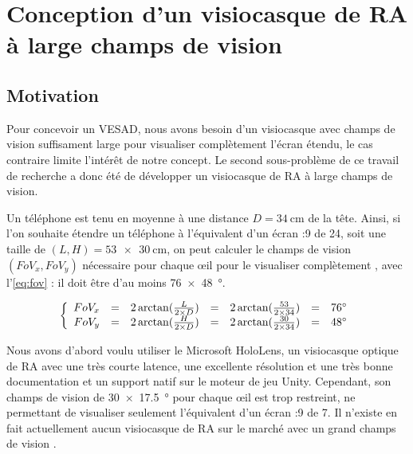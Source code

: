 \chapter{Conception d'un visiocasque de RA à large champs de vision}
\label{ch:methodology}

\section{Motivation}
Pour concevoir un VESAD, nous avons besoin d'un visiocasque avec champs de vision suffisament large pour visualiser complètement l'écran étendu, le cas contraire limite l'intérêt de notre concept. Le second sous-problème de ce travail de recherche a donc été de développer un visiocasque de RA à large champs de vision.

Un téléphone est tenu en moyenne à une distance $D=\SI{34}{\cm}$ \citep{Bababekova2011} de la tête. Ainsi, si l'on souhaite étendre un téléphone à l'équivalent d'un écran {:9} de \SI{24}{\inch}, soit une taille de $(L,H)=\SI{53x30}{\cm}$, on peut calculer le champs de vision $(FoV_x,FoV_y)$ nécessaire pour chaque \oe il pour le visualiser complètement , avec l'\autoref{eq:fov} : il doit être d'au moins \SI{76x48}{\degree}.

\begin{equation}
  \label{eq:fov}
  \left \{
  \begin{array}{r c c c c c l}
    FoV_x & = & 2 \arctan (\frac{L}{2 \times D}) & = & 2 \arctan (\frac{53}{2 \times 34}) & = & \ang{76}\\
    FoV_y & = & 2 \arctan (\frac{H}{2 \times D}) & = & 2 \arctan (\frac{30}{2 \times 34}) & = & \ang{48}
  \end{array}
  \right .
\end{equation}


Nous avons d'abord voulu utiliser le Microsoft HoloLens, un visiocasque optique de RA avec une très courte latence, une excellente résolution et une très bonne documentation et un support natif sur le moteur de jeu Unity. Cependant, son champs de vision de \SI{30x17.5}{\degree} pour chaque \oe il \citep{Kreylos2015} est trop restreint, ne permettant de visualiser seulement l'équivalent d'un écran {:9} de \SI{7}{\inch}. Il n'existe en fait actuellement aucun visiocasque de RA sur le marché avec un grand champs de vision \citep[p. 25]{Millette2016}.


